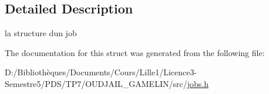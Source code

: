 \subsection{Detailed Description}
la structure d\textquotesingle{}un job 

The documentation for this struct was generated from the following file\+:\begin{DoxyCompactItemize}
\item 
D\+:/\+Bibliothèques/\+Documents/\+Cours/\+Lille1/\+Licence3-\/\+Semestre5/\+P\+D\+S/\+T\+P7/\+O\+U\+D\+J\+A\+I\+L\+\_\+\+G\+A\+M\+E\+L\+I\+N/src/\hyperlink{jobs_8h}{jobs.\+h}\end{DoxyCompactItemize}

